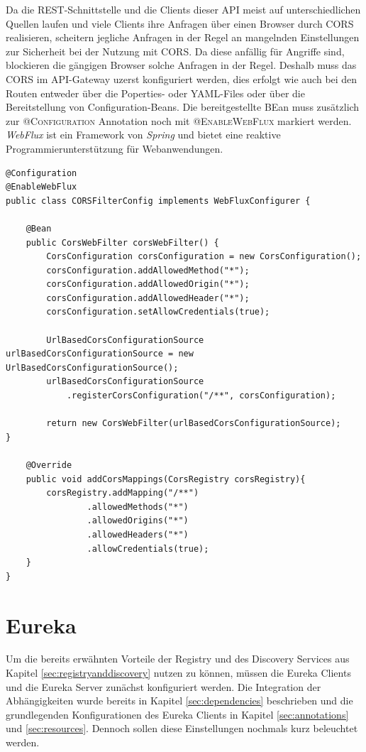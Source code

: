 Da die \ac{REST}-Schnittstelle und die Clients dieser \ac{API} meist auf unterschiedlichen Quellen laufen und viele Clients ihre Anfragen über einen Browser durch \ac{CORS} realisieren, scheitern jegliche Anfragen in der Regel an mangelnden Einstellungen zur Sicherheit bei der Nutzung mit \ac{CORS}. Da diese anfällig für Angriffe sind, blockieren die gängigen Browser solche Anfragen in der Regel. Deshalb muss das \ac{CORS} im \ac{API}-Gateway uzerst konfiguriert werden, dies erfolgt wie auch bei den Routen entweder über die Poperties- oder \ac{YAML}-Files oder über die Bereitstellung von Configuration-Beans. Die bereitgestellte BEan muss zusätzlich zur \textsc{@Configuration} Annotation noch mit \textsc{@EnableWebFlux} markiert werden. \textit{WebFlux} ist ein Framework von \textit{Spring} und bietet eine reaktive Programmierunterstützung für Webanwendungen.

\newpage
\begin{lstlisting}[caption={CORS-Filter Konfigurationsklasse}, label={code:cors}]
@Configuration
@EnableWebFlux
public class CORSFilterConfig implements WebFluxConfigurer {

    @Bean
    public CorsWebFilter corsWebFilter() {
        CorsConfiguration corsConfiguration = new CorsConfiguration();
        corsConfiguration.addAllowedMethod("*");
        corsConfiguration.addAllowedOrigin("*");
        corsConfiguration.addAllowedHeader("*");
        corsConfiguration.setAllowCredentials(true);

        UrlBasedCorsConfigurationSource urlBasedCorsConfigurationSource = new UrlBasedCorsConfigurationSource();
        urlBasedCorsConfigurationSource
            .registerCorsConfiguration("/**", corsConfiguration);

        return new CorsWebFilter(urlBasedCorsConfigurationSource);
}

    @Override
    public void addCorsMappings(CorsRegistry corsRegistry){
        corsRegistry.addMapping("/**")
                .allowedMethods("*")
                .allowedOrigins("*")
                .allowedHeaders("*")
                .allowCredentials(true);
    }
}
\end{lstlisting}

\section{Eureka}

Um die bereits erwähnten Vorteile der Registry und des Discovery Services aus Kapitel \ref{sec:registryanddiscovery} nutzen zu können, müssen die Eureka Clients und die Eureka Server zunächst konfiguriert werden. Die Integration der Abhängigkeiten wurde bereits in Kapitel \ref{sec:dependencies} beschrieben und die grundlegenden Konfigurationen des Eureka Clients in Kapitel \ref{sec:annotations} und \ref{sec:resources}. Dennoch sollen diese Einstellungen nochmals kurz beleuchtet werden.

